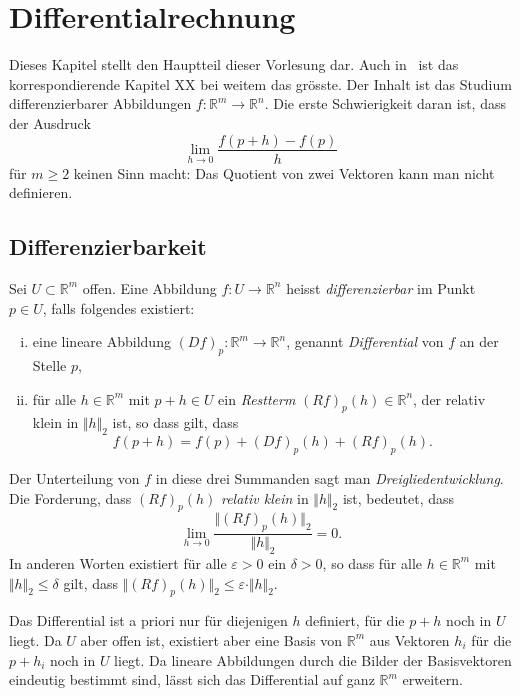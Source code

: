 \documentclass[../main.tex]{subfiles}
\begin{document}
\chapter{Differentialrechnung}\label{chp:differential}
Dieses Kapitel stellt den Hauptteil dieser Vorlesung dar.
Auch in~\cite{heuser} ist das korrespondierende
Kapitel XX bei weitem das grösste. Der Inhalt ist das
Studium differenzierbarer Abbildungen 
$f \colon \mathbb{R}^m \to \mathbb{R}^n$.
Die erste Schwierigkeit daran ist, dass der Ausdruck
\[
  \lim_{h \to 0} \frac{f(p + h) - f(p)}{h}
\]
für $m \geq 2$ keinen Sinn macht: Das Quotient von zwei Vektoren kann man nicht
definieren.

\section{Differenzierbarkeit}
\begin{definition}
  Sei $U \subset \mathbb{R}^m$ offen. Eine Abbildung
  $f \colon U \to \mathbb{R}^n$ heisst
  \emph{differenzierbar} im Punkt $p \in U$, falls
  folgendes existiert:
  \begin{enumerate}[(i)]
    \item eine lineare Abbildung 
      ${(Df)}_p \colon \mathbb{R}^m \to \mathbb{R}^n$,
      genannt \emph{Differential} von $f$ an
      der Stelle $p$,
    \item für alle $h \in \mathbb{R}^m$ mit $p + h \in U$ 
      ein \emph{Restterm} ${(Rf)}_p(h) \in \mathbb{R}^n$,
      der relativ klein in $\Vert h \Vert_2$ ist,
      so dass %
      gilt, dass
      \[
        f(p+h) = f(p) + {(Df)}_p(h) + {(Rf)}_p(h).
      \]
  \end{enumerate}
  Der Unterteilung von $f$ in diese drei Summanden sagt man
  \emph{Dreigliedentwicklung}. Die Forderung,
  dass ${(Rf)}_p(h)$ \emph{relativ klein} in $\Vert h \Vert_2$ 
  ist, bedeutet, dass
  \[
    \lim_{h \to 0} \frac{\Vert {(Rf)}_p(h)\Vert_2}{\Vert h \Vert_2}
    = 0.
  \]
  In anderen Worten existiert für alle $\varepsilon > 0$ ein $\delta > 0 $,
  so dass für alle $h \in \mathbb{R}^m$ mit $\Vert h \Vert_2
  \leq \delta$ gilt, dass $\Vert {(Rf)}_p(h) \Vert_2
  \leq \varepsilon \cdot \Vert h \Vert_2$.
\end{definition}

\begin{remark}
  Das Differential ist a priori nur für diejenigen
  $h$ definiert, für die $p + h$ noch in $U$ 
  liegt. Da $U$ aber offen ist, existiert aber
  eine Basis von $\mathbb{R}^m$ aus Vektoren
  $h_i$ für die $p + h_i$ noch in $U$ liegt.
  Da lineare Abbildungen durch die Bilder der
  Basisvektoren eindeutig bestimmt sind, lässt
  sich das Differential auf ganz $\mathbb{R}^m$
  erweitern.
\end{remark}
\end{document}
